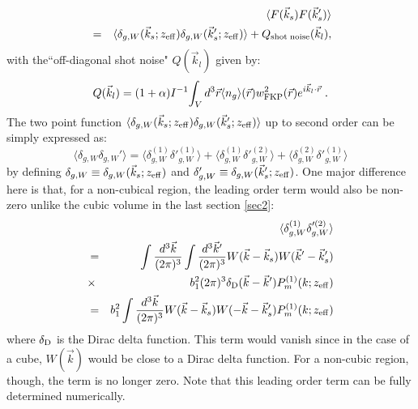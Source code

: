 \documentclass[prd,amsmath,amssymb,floatfix,superscriptaddress,nofootinbib,twocolumn]{revtex4-1}
\def\be{\begin{equation}}
\def\ee{\end{equation}}
\def\bea{\begin{eqnarray}}
\def\eea{\end{eqnarray}}
\newcommand{\vrr}{\vec{r}}
\newcommand{\vs}{\nonumber\\}
\newcommand{\vk}{\vec{k}}
\begin{document}
\begin{eqnarray}
&&\langle F(\vec{k}_s)F(\vec{k}'_s)\rangle\nonumber\\
&=&\langle \delta_{g,W}(\vec{k}_s;z_{\rm eff})\delta_{g,W}(\vec{k}'_s;z_{\rm eff}) \rangle+Q_{\rm shot \; noise}(\vec{k}_l),
\end{eqnarray}
with the``off-diagonal shot noise" $Q(\vk_l)$ given by:
\be 
Q(\vk_l)=(1+\alpha)I^{-1}{\int_{V}d^{3}\vec{r} \langle n_{g}\rangle (\vec{r}) w_{\rm FKP}^{2}(\vec{r})e^{i\vec{k}_l\cdot \vrr}}\;.
\ee 
The two point function $\langle \delta_{g,W}(\vec{k}_s;z_{\rm eff})\delta_{g,W}(\vec{k}'_s;z_{\rm eff}) \rangle$ up to second order can be simply expressed as:
\be 
\langle \delta_{g,W}\delta_{g,W}' \rangle=\langle \delta^{(1)}_{g,W}\delta'^{(1)}_{g,W} \rangle+\langle \delta^{(1)}_{g,W}\delta'^{(2)}_{g,W} \rangle+\langle \delta^{(2)}_{g,W}\delta'^{(1)}_{g,W} \rangle
\ee
by defining $\delta_{g,W}\equiv\delta_{g,W}(\vec{k}_s;z_{\rm eff})$ and $\delta_{g,W}'\equiv\delta_{g,W}(\vec{k}'_s;z_{\rm eff})$.  One major difference here is that, for a non-cubical region, the leading order term would also be non-zero unlike the cubic volume in the last section \ref{sec2}:
\bea
&&\langle \delta^{(1)}_{g,W}\delta'^{(2)}_{g,W} \rangle\vs
&=&\int \frac{d^3\vec{k}}{(2\pi)^3}\int \frac{d^3\vec{k}'}{(2\pi)^3}W(\vk-\vk_s)W(\vk'-\vk'_s)\vs
&\times & b_1^2 (2\pi)^3\delta_{\rm D} (\vk-\vk') P_m^{(1)}(k;z_{\rm eff})\vs
&=&b_1^2\int \frac{d^3\vec{k}}{(2\pi)^3}W(\vk-\vk_s)W(-\vk-\vk'_s)P_m^{(1)}(k;z_{\rm eff})
\eea 
where $\delta_{\rm D}$ is the Dirac delta function. This term would vanish since in the case of a cube, $W(\vk)$ would be close to a Dirac delta function. For a non-cubic region, though, the term is no longer zero. Note that this leading order term can be fully determined numerically.
\end{document}
